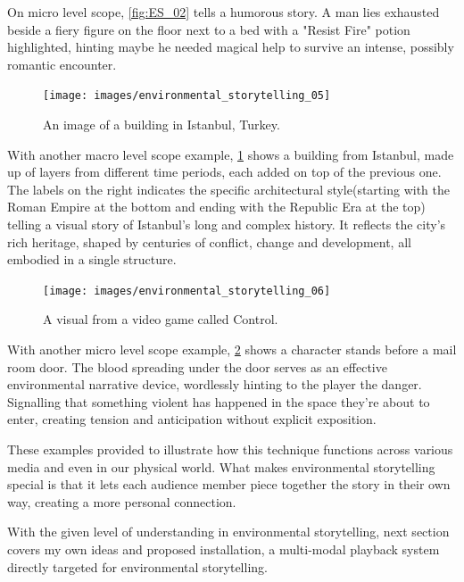     On micro level scope, \ref{fig:ES_02} tells a humorous story. A man lies exhausted beside a fiery figure on the floor next to a bed with a "Resist Fire" potion highlighted, hinting maybe he needed magical help to survive an intense, possibly romantic encounter.\par

    \begin{figure}[H]
    \centering
    \texttt{[image: images/environmental\_storytelling\_05]}
    \caption{An image of a building in Istanbul, Turkey.}
    \label{fig:ES_03}
    \end{figure}

    With another macro level scope example, \ref{fig:ES_03} shows a building from Istanbul, made up of layers from different time periods, each added on top of the previous one. The labels on the right indicates the specific architectural style(starting with the Roman Empire at the bottom and ending with the Republic Era at the top) telling a visual story of Istanbul’s long and complex history. It reflects the city’s rich heritage, shaped by centuries of conflict, change and development, all embodied in a single structure.\par

    \begin{figure}[H]
    \centering
    \texttt{[image: images/environmental\_storytelling\_06]}
    \caption{A visual from a video game called Control.}
    \label{fig:ES_04}
    \end{figure}

    With another micro level scope example, \ref{fig:ES_04} shows a character stands before a mail room door. The blood spreading under the door serves as an effective environmental narrative device, wordlessly hinting to the player the danger. Signalling that something violent has happened in the space they're about to enter, creating tension and anticipation without explicit exposition.\par    

    These examples provided to illustrate how this technique functions across various media and even in our physical world. What makes environmental storytelling special is that it lets each audience member piece together the story in their own way, creating a more personal connection.\par

    With the given level of understanding in environmental storytelling, next section covers my own ideas and proposed installation, a multi-modal playback system directly targeted for environmental storytelling.\par
